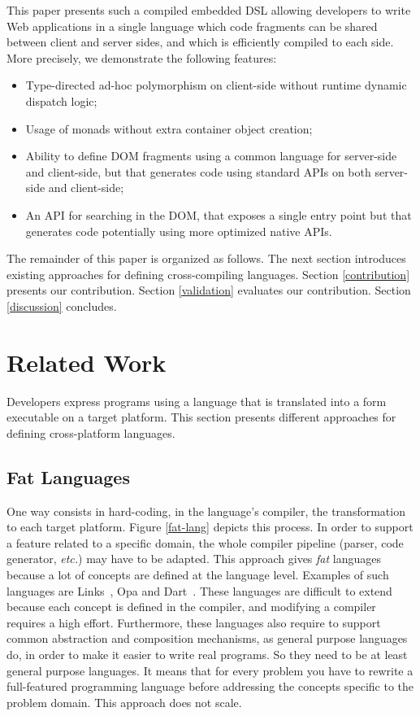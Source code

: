 \documentclass[preprint]{sigplanconf}
\newcommand{\etc}{\emph{etc.}}
\begin{document}
This paper presents such a compiled embedded DSL allowing developers to write Web applications in a single language
which code fragments can be shared between client and server sides, and which is efficiently compiled to each side.
More precisely, we demonstrate the following features:

\begin{itemize}
 \item Type-directed ad-hoc polymorphism on client-side without runtime dynamic dispatch logic;
 \item Usage of monads without extra container object creation;
 \item Ability to define DOM fragments using a common language for server-side and client-side, but that generates
code using standard APIs on both server-side and client-side;
 \item An API for searching in the DOM, that exposes a single entry point but that generates code potentially using
more optimized native APIs.
\end{itemize}

The remainder of this paper is organized as follows. The next section introduces existing approaches for defining
cross-compiling languages. Section \ref{contribution} presents our contribution. Section \ref{validation} evaluates
our contribution. Section \ref{discussion} concludes.

\section{Related Work}

Developers express programs using a language that is translated into a form executable on a target platform. This
section presents different approaches for defining cross-platform languages.

\subsection{Fat Languages}

One way consists in hard-coding, in the language’s compiler, the transformation to each target platform. Figure
\ref{fat-lang} depicts this process. In order to support a feature related to a specific domain, the whole compiler
pipeline (parser, code generator, \etc) may have to be adapted. This approach gives \emph{fat} languages because
a lot of concepts are defined at the language level. Examples of such languages are Links~\cite{Cooper07_Links},
Opa and Dart~\cite{Griffith11_Dart}. These languages are difficult to extend because each concept is defined in the
compiler, and modifying a compiler requires a high effort. Furthermore, these languages also require to support
common abstraction and composition mechanisms, as general purpose languages do, in order to make it easier to write
real programs. So they need to be at least general purpose languages. It means that for every problem you have to
rewrite a full-featured programming language before addressing the concepts specific to the problem domain. This
approach does not scale.
\end{document}
